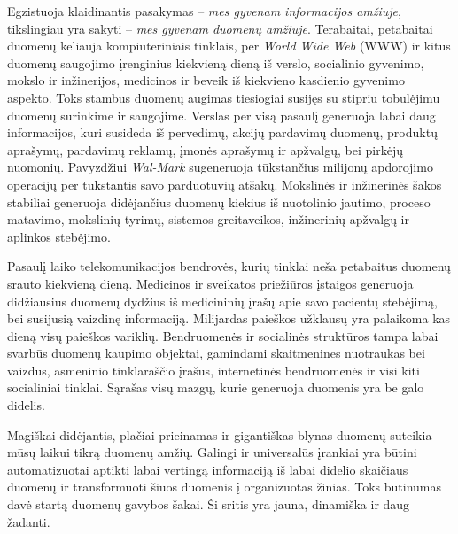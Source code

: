 Egzistuoja klaidinantis pasakymas -- \textit{mes gyvenam informacijos amžiuje}, tikslingiau yra sakyti -- \textit{mes gyvenam duomenų amžiuje}. 
Terabaitai, petabaitai duomenų keliauja kompiuteriniais tinklais, per \textit{World Wide Web} (WWW) ir kitus duomenų saugojimo įrenginius kiekvieną dieną iš verslo, socialinio gyvenimo, mokslo ir inžinerijos, medicinos ir beveik iš kiekvieno kasdienio gyvenimo aspekto. 
Toks stambus duomenų augimas tiesiogiai susijęs su stipriu tobulėjimu duomenų surinkime ir saugojime. 
Verslas per visą pasaulį generuoja labai daug informacijos, kuri susideda iš pervedimų, akcijų pardavimų duomenų, produktų aprašymų, pardavimų reklamų, įmonės aprašymų ir apžvalgų, bei pirkėjų nuomonių. 
Pavyzdžiui \textit{Wal-Mark} sugeneruoja tūkstančius milijonų apdorojimo operacijų per tūkstantis savo parduotuvių atšakų. 
Mokslinės ir inžinerinės šakos stabiliai generuoja didėjančius duomenų kiekius iš nuotolinio jautimo, proceso matavimo, mokslinių tyrimų, sistemos greitaveikos, inžinerinių apžvalgų ir aplinkos stebėjimo.

Pasaulį laiko telekomunikacijos bendrovės, kurių tinklai neša petabaitus duomenų srauto kiekvieną dieną.
Medicinos ir sveikatos priežiūros įstaigos generuoja didžiausius duomenų dydžius iš medicininių įrašų apie savo pacientų stebėjimą, bei susijusią vaizdinę informaciją. 
Milijardas paieškos užklausų yra palaikoma kas dieną visų paieškos variklių.
Bendruomenės ir socialinės struktūros tampa labai svarbūs duomenų kaupimo objektai, gamindami skaitmenines nuotraukas bei vaizdus, asmeninio tinklaraščio įrašus, internetinės bendruomenės ir visi kiti socialiniai tinklai.
Sąrašas visų mazgų, kurie generuoja duomenis yra be galo didelis.

Magiškai didėjantis, plačiai prieinamas ir gigantiškas blynas duomenų suteikia mūsų laikui tikrą duomenų amžių.
Galingi ir universalūs įrankiai yra būtini automatizuotai aptikti labai vertingą informaciją iš labai didelio skaičiaus duomenų ir transformuoti šiuos duomenis į organizuotas žinias.
Toks būtinumas davė startą duomenų gavybos šakai. 
Ši sritis yra jauna, dinamiška ir daug žadanti.
